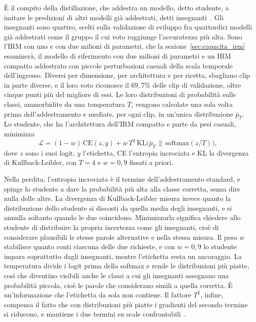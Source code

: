 È il compito della distillazione, che addestra un modello, detto studente, a imitare le predizioni di altri modelli già addestrati, detti insegnanti~\cite{hinton2015distilling}. Gli insegnanti sono quattro, scelti sulla validazione di sviluppo fra quattordici modelli già addestrati come il gruppo il cui voto raggiunge l'accuratezza più alta. Sono l'IRM con uno e con due milioni di parametri, che la sezione~\ref{sec:capacita_irm} esaminerà, il modello di riferimento con due milioni di parametri e un IRM compatto addestrato con piccole perturbazioni casuali della scala temporale dell'ingresso. Diversi per dimensione, per architettura e per ricetta, sbagliano clip in parte diverse, e il loro voto riconosce il $69{,}7\%$ delle clip di validazione, oltre cinque punti più del migliore di essi. Le loro distribuzioni di probabilità sulle classi, ammorbidite da una temperatura $T$, vengono calcolate una sola volta prima dell'addestramento e mediate, per ogni clip, in un'unica distribuzione $\bar p_T$. Lo studente, che ha l'architettura dell'IRM compatto e parte da pesi casuali, minimizza
\begin{equation}
\label{eq:distillazione}
\mathcal L=(1-w)\,\mathrm{CE}(z,y)+w\,T^{2}\,\mathrm{KL}\bigl(\bar p_T\,\big\|\,\mathrm{softmax}(z/T)\bigr),
\end{equation}
dove $z$ sono i suoi logit, $y$ l'etichetta, CE l'entropia incrociata e KL la divergenza di Kullback-Leibler, con $T=4$ e $w=0{,}9$ fissati a priori.

Nella perdita, l'entropia incrociata è il termine dell'addestramento standard, e spinge lo studente a dare la probabilità più alta alla classe corretta, senza dire nulla delle altre. La divergenza di Kullback-Leibler misura invece quanto la distribuzione dello studente si discosti da quella media degli insegnanti, e si annulla soltanto quando le due coincidono. Minimizzarla significa chiedere allo studente di distribuire la propria incertezza come gli insegnanti, cioè di considerare plausibili le stesse parole alternative e nella stessa misura. Il peso $w$ stabilisce quanto conti ciascuna delle due richieste, e con $w=0{,}9$ lo studente impara soprattutto dagli insegnanti, mentre l'etichetta resta un ancoraggio. La temperatura divide i logit prima della softmax e rende le distribuzioni più piatte, così che diventino visibili anche le classi a cui gli insegnanti assegnano una probabilità piccola, cioè le parole che considerano simili a quella corretta. È un'informazione che l'etichetta da sola non contiene. Il fattore $T^2$, infine, compensa il fatto che con distribuzioni più piatte i gradienti del secondo termine si riducono, e mantiene i due termini su scale confrontabili~\cite{hinton2015distilling}.


